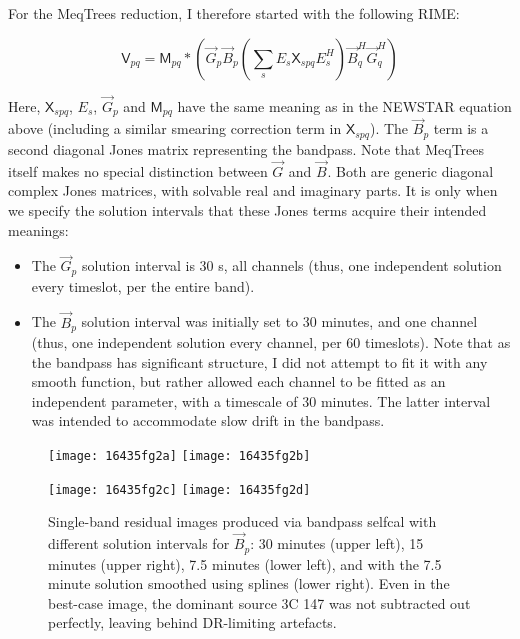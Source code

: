 \documentclass{aa}
\newcommand{\herm}{H}
\newcommand{\jones}[2]{\vec {#1}_{#2}}
\newcommand{\jonesT}[2]{\vec {#1}^{\herm}_{#2}}
\newcommand{\coh}[2]{\mathsf{{#1}}_{{#2}}}
\begin{document}
For the MeqTrees reduction, I therefore started with the following RIME:

\begin{equation}\label{eq:3C 147:bandpass}
\coh{V}{pq} = \coh{M}{pq} \ast \left ( \jones{G}{p} \jones{B}{p} \left( \sum_s E_s \coh{X}{spq} E^{\herm}_s \right)  \jonesT{B}{q} \jonesT{G}{q} \right )
\end{equation}

Here, $\coh{X}{spq}$, $E_s$, $\jones{G}{p}$ and $\coh{M}{pq}$ have the same meaning as in the NEWSTAR equation above (including a similar smearing correction term in $\coh{X}{spq}$). The $\jones{B}{p}$ term is a second diagonal Jones matrix representing the bandpass. Note that MeqTrees itself makes no special distinction between $\jones{G}{}$ and $\jones{B}{}$. Both are generic diagonal complex Jones matrices, with solvable real and imaginary parts. It is only when we specify the solution intervals that these Jones terms acquire their intended meanings:

\begin{itemize}
\item The $\jones{G}{p}$ solution interval is 30 s, all channels (thus, one independent solution every timeslot, per the entire band).
\item The $\jones{B}{p}$ solution interval was initially set to 30 minutes, and one channel (thus, one independent solution every channel, per 60 timeslots). Note that as the bandpass has significant structure, I did not attempt to fit it with any smooth function, but rather allowed each channel to be fitted as an independent parameter, with a timescale of 30 minutes. The latter interval was intended to accommodate slow drift in the bandpass.
\end{itemize}

\begin{figure}
\begin{centering}
\texttt{[image: 16435fg2a]}%
\texttt{[image: 16435fg2b]}\par
\texttt{[image: 16435fg2c]}%
\texttt{[image: 16435fg2d]}\par
\end{centering}
\caption{\label{fig:Bsol}Single-band residual images produced via bandpass selfcal with different solution intervals for $\jones{B}{p}$: 30 minutes (upper left), 15 minutes (upper right), 7.5 minutes (lower left), and with the 7.5 minute solution smoothed using splines (lower right). Even in the best-case image, the dominant source 3C 147 was not subtracted out perfectly, leaving behind DR-limiting artefacts.}
\end{figure}
\end{document}
